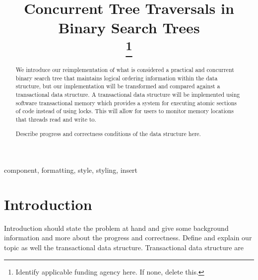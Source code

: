 \documentclass[conference]{IEEEtran}
\begin{document}
\title{Concurrent Tree Traversals in Binary Search Trees\\
\thanks{Identify applicable funding agency here. If none, delete this.}
}

\author{
\and
{}
}

\maketitle

\begin{abstract}
We introduce our reimplementation of what is considered a practical and concurrent binary search tree that maintains logical ordering information within the data structure, but our implementation will be transformed and compared against a transactional data structure. A transactional data structure will be implemented using software transactional memory which provides a system for executing atomic sections of code instead of using locks. This will allow for users to monitor memory locations that threads read and write to.

Describe progress and correctness conditions of the data structure here.

\end{abstract}

\begin{IEEEkeywords}
component, formatting, style, styling, insert
\end{IEEEkeywords}

\section{Introduction}
Introduction should state the problem at hand and give some background information and more about the progress and correctness. 
Define and explain our topic as well the transactional data structure.
Transactional data structure are
\end{document}
